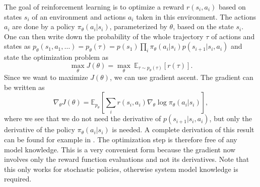 \documentclass[conference, 10pt]{IEEEtran}
\begin{document}
The goal of reinforcement learning is to optimize a reward $r(s_i,a_i)$ based on states $s_i$ of an environment and actions $a_i$ taken in this environment. The actions $a_i$ are done by a policy $\pi_{\theta}(a_i|s_i)$, parameterized by $\theta$, based on the state $s_i$. One can then write down the probability of the whole trajectory $\tau$ of actions and states as $p_{\theta}(s_1,a_1,\ldots)=p_{\theta}(\tau)=p(s_1)\prod_i \pi_{\theta}(a_i|s_i)p(s_{i+1}|s_i,a_i)$ and state the optimization problem as
\begin{equation*}
    \max_{\theta} J(\theta) = \max_{\theta}  \: \mathbb{E}_{\tau\sim p_{\theta}(\tau)} [r(\tau)].
\end{equation*}
Since we want to maximize $J(\theta)$, we can use gradient ascent. The gradient can be written as 
\begin{equation*}
    \nabla_{\theta} J(\theta) = \mathbb{E}_{p_{\theta}} \left[ \sum_i r(s_i,a_i) \nabla_{\theta} \log \pi_{\theta}(a_i|s_i) \right],
\end{equation*} where we see that we do not need the derivative of $p(s_{i+1}|s_i,a_i)$, but only the derivative of the policy $\pi_{\theta}(a_i|s_i)$ is needed. A complete derivation of this result can be found for example in \cite{sutton2018reinforcement}. The optimization step is therefore free of any model knowledge. This is a very convenient form because the gradient now involves only the reward function evaluations and not its derivatives. Note that this only works for stochastic policies, otherwise system model knowledge is required. 
\end{document}
